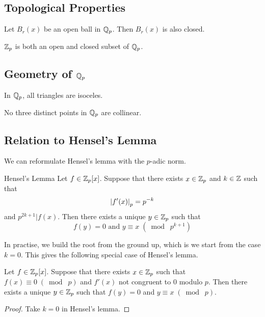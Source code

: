 \documentclass[a4paper]{article}
\begin{document}
\subsection{Topological Properties}
\begin{thm}{}{} Let $B_r(x)$ be an open ball in $\mathbb{Q}_p$. Then $B_r(x)$ is also closed. 
\end{thm}

\begin{crl}{}{} $\mathbb{Z}_p$ is both an open and closed subset of $\mathbb{Q}_p$. 
\end{crl}

\subsection{Geometry of $\mathbb{Q}_p$}
\begin{thm}{}{} In $\mathbb{Q}_p$, all triangles are isoceles. 
\end{thm}

\begin{lmm}{}{} No three distinct points in $\mathbb{Q}_p$ are collinear. 
\end{lmm}

\subsection{Relation to Hensel's Lemma}
We can reformulate Hensel's lemma with the $p$-adic norm. 

\begin{prp}{Hensel's Lemma}{} Let $f\in\mathbb{Z}_p[x]$. Suppose that there exists $x\in\mathbb{Z}_p$ and $k\in\mathbb{Z}$ such that $$\abs{f'(x)}_p=p^{-k}$$ and $p^{2k+1}|f(x)$. Then there exists a unique $y\in\mathbb{Z}_p$ such that $$f(y)=0\text{ and }y\equiv x\;(\bmod\;p^{k+1})$$
\end{prp}

In practise, we build the root from the ground up, which is we start from the case $k=0$. This gives the following special case of Hensel's lemma. 

\begin{lmm}{}{} Let $f\in\mathbb{Z}_p[x]$. Suppose that there exists $x\in\mathbb{Z}_p$ such that $f(x)\equiv 0\;(\bmod\;p)$ and $f'(x)$ not congruent to $0$ modulo $p$. Then there exists a unique $y\in\mathbb{Z}_p$ such that $f(y)=0$ and $y\equiv x\;(\bmod\;p)$. \tcbline
\begin{proof}
Take $k=0$ in Hensel's lemma. 
\end{proof}
\end{lmm}
\end{document}
